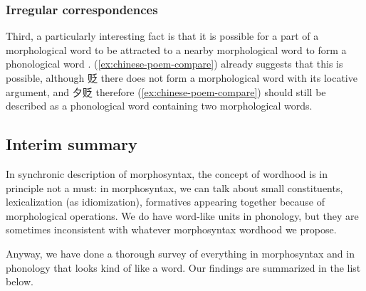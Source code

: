 \documentclass[a4paper, oneside, scheme=plain, 12pt]{article}
\newcommand*{\citepage}[1]{p.~{#1}}
\begin{document}
\subsubsection{Irregular correspondences}

Third, a particularly interesting fact is that it is possible for a part of a morphological word
to be attracted to a nearby morphological word to form a phonological word
\citep[\citepage{24}]{dixon2010basic2}.
(\ref{ex:chinese-poem-compare}) already suggests that this is possible,
although 贬 there does not form a morphological word with its locative argument,
and 夕贬 therefore (\ref{ex:chinese-poem-compare}) should still be described as
a phonological word containing two morphological words.

\subsection{Interim summary}\label{sec:all-wordhood}

In synchronic description of morphosyntax,
the concept of wordhood is in principle not a must:
in morphosyntax, we can talk about small constituents, lexicalization (as idiomization),
formatives appearing together because of morphological operations.
We do have word-like units in phonology,
but they are sometimes inconsistent with whatever morphosyntax wordhood we propose.

Anyway, we have done a thorough survey of everything in morphosyntax and in phonology that looks kind of like a word. 
Our findings are summarized in the list below.
\end{document}
